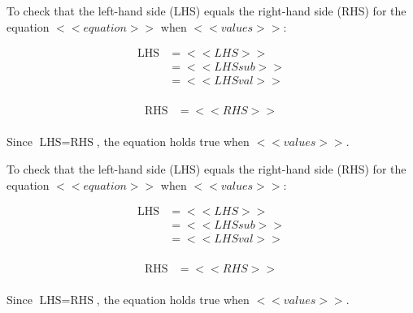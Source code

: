 \noindent{(\theminipagecount)}\hspace{0.1mm} %
\begin{minipage}[t]{0.99\textwidth} %
    To check that the left-hand side (LHS) equals the right-hand side (RHS) for the equation \( <<equation>> \) when \( <<values>> \):

    \begin{multicols}{2}
    \noindent
    \begin{align*}
    \text{LHS} &= <<LHS>> \\
               &= <<LHSsub>> \\
               &= <<LHSval>> \\
    \end{align*}

    \columnbreak

    \noindent
    \begin{align*}
    \text{RHS} &= <<RHS>> \\
    \end{align*}
    \end{multicols}

    Since \(\text{LHS} = \text{RHS}\), the equation holds true when \( <<values>> \).

\end{minipage}

To check that the left-hand side (LHS) equals the right-hand side (RHS) for the equation \( <<equation>> \) when \( <<values>> \):

\begin{multicols}{2}
\noindent
\begin{align*}
\text{LHS} &= <<LHS>> \\
           &= <<LHSsub>> \\
           &= <<LHSval>> \\
\end{align*}

\columnbreak

\noindent
\begin{align*}
\text{RHS} &= <<RHS>> \\
\end{align*}
\end{multicols}

Since \(\text{LHS} = \text{RHS}\), the equation holds true when \( <<values>> \).
